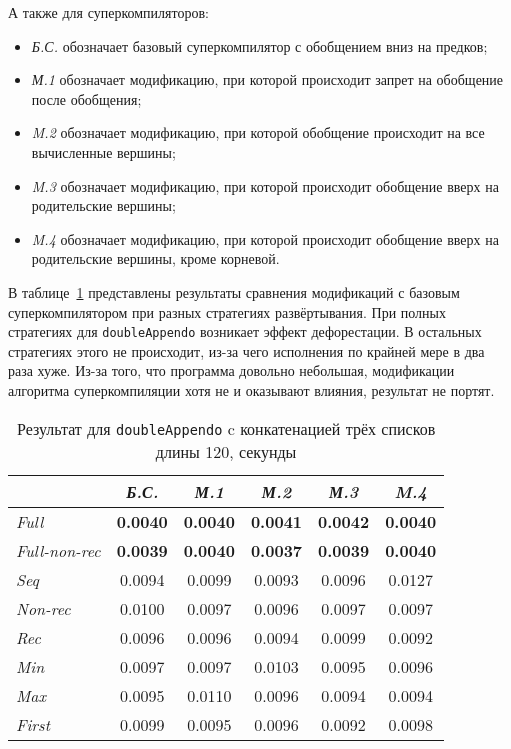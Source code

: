А также для суперкомпиляторов:
\begin{itemize}
\item {\it Б.С.} обозначает базовый суперкомпилятор с обобщением вниз на предков;
\item {\it М.1 } обозначает модификацию, при которой происходит запрет на обобщение после обобщения;
\item {\it M.2 } обозначает модификацию, при которой обобщение происходит на все вычисленные вершины;
\item {\it M.3 } обозначает модификацию, при которой происходит обобщение вверх на родительские вершины;
\item {\it M.4 } обозначает модификацию, при которой происходит обобщение вверх на родительские вершины, кроме корневой.

\end{itemize}


В таблице~\ref{fig:dappTest} представлены результаты сравнения модификаций
с базовым суперкомпилятором при разных стратегиях развёртывания.
При полных стратегиях для \lstinline{doubleAppendo} возникает эффект дефорестации.
В остальных стратегиях этого не происходит, из-за чего исполнения по
крайней мере в два раза хуже. Из-за того, что программа довольно небольшая,
модификации алгоритма суперкомпиляции хотя не и оказывают влияния, результат не портят.

\begin{table}[h!]
\center
\begin{tabular}{|l|c|c|c|c|c|}
\hline
                   &{\it Б.С.}&{\it М.1}&{\it М.2}&{\it М.3}&{\it M.4} \\ \hline
{\it Full        } &{\bf 0.0040}  & {\bf 0.0040 } & {\bf 0.0041 } & {\bf 0.0042 } & {\bf 0.0040 }  \\ \hline
{\it Full-non-rec} &{\bf 0.0039}  & {\bf 0.0040 } & {\bf 0.0037 } & {\bf 0.0039 } & {\bf 0.0040 }  \\ \hline
{\it Seq         } &0.0094  &  0.0099 & 0.0093 &0.0096 & 0.0127  \\ \hline
{\it Non-rec     } &0.0100  &  0.0097 & 0.0096 &0.0097 & 0.0097  \\ \hline
{\it Rec         } &0.0096  &  0.0096 & 0.0094 &0.0099 & 0.0092  \\ \hline
{\it Min         } &0.0097  &  0.0097 & 0.0103 &0.0095 & 0.0096  \\ \hline
{\it Max         } &0.0095  &  0.0110 & 0.0096 &0.0094 & 0.0094  \\ \hline
{\it First       } &0.0099  &  0.0095 & 0.0096 &0.0092 & 0.0098  \\ \hline
\end{tabular}
\caption{Результат для \lstinline{doubleAppendo} c конкатенацией трёх списков длины 120, секунды}
\label{fig:dappTest}
\end{table}

